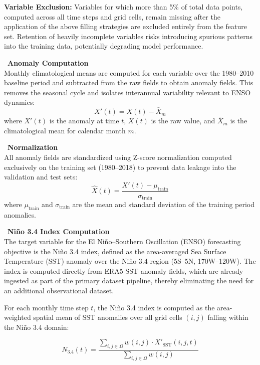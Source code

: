 \textbf{Variable Exclusion:} Variables for which more than 5\% of total data points, computed across all time steps and grid cells, remain missing after the application of the above filling strategies are excluded entirely from the feature set. Retention of heavily incomplete variables risks introducing spurious patterns into the training data, potentially degrading model performance.

\noindent\textbullet\ \textbf{Anomaly Computation}\\
\label{sec:anomaly}
Monthly climatological means are computed for each variable over the 1980--2010 baseline period and subtracted from the raw fields to obtain anomaly fields. This removes the seasonal cycle and isolates interannual variability relevant to ENSO dynamics:
\begin{equation}
    X'(t) = X(t) - \bar{X}_{m}
\end{equation}
where $X'(t)$ is the anomaly at time $t$, $X(t)$ is the raw value, and $\bar{X}_{m}$ is the climatological mean for calendar month $m$.

\noindent\textbullet\ \textbf{Normalization}\\
All anomaly fields are standardized using Z-score normalization computed exclusively on the training set (1980--2018) to prevent data leakage into the validation and test sets:
\begin{equation}
    \hat{X}(t) = \frac{X'(t) - \mu_{\text{train}}}{\sigma_{\text{train}}}
\end{equation}
where $\mu_{\text{train}}$ and $\sigma_{\text{train}}$ are the mean and standard deviation of the training period anomalies.

\noindent\textbullet\ \textbf{Ni\~{n}o 3.4 Index Computation}\\
The target variable for the El Ni\~{n}o--Southern Oscillation (ENSO) forecasting objective is the Ni\~{n}o 3.4 index, defined as the area-averaged Sea Surface Temperature (SST) anomaly over the Ni\~{n}o 3.4 region (5\degree S--5\degree N, 170\degree W--120\degree W). The index is computed directly from ERA5 SST anomaly fields, which are already ingested as part of the primary dataset pipeline, thereby eliminating the need for an additional observational dataset.

For each monthly time step $t$, the Ni\~{n}o 3.4 index is computed as the area-weighted spatial mean of SST anomalies over all grid cells $(i,j)$ falling within the Ni\~{n}o 3.4 domain:

\begin{equation}
    N_{3.4}(t) = \frac{\sum_{i,j \in \Omega} w(i,j) \cdot X'_{\text{SST}}(i,j,t)}{\sum_{i,j \in \Omega} w(i,j)}
\end{equation}

